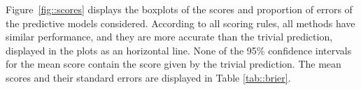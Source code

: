 \documentclass[journal,article,accept,moreauthors,pdftex,12pt,a4paper]{mdpi}
\begin{document}
	
	
	
	
	
	Figure~\ref{fig::scores} displays the boxplots of the scores and proportion of errors of the predictive models considered.
	According to all scoring rules, all methods have similar performance, and they are more accurate than the trivial prediction, displayed in the plots
	as an horizontal line. None of the 95\% confidence intervals for the mean score contain the score given by the trivial prediction. The mean scores and their standard errors are displayed
	in Table \ref{tab::brier}.
	
\end{document}
